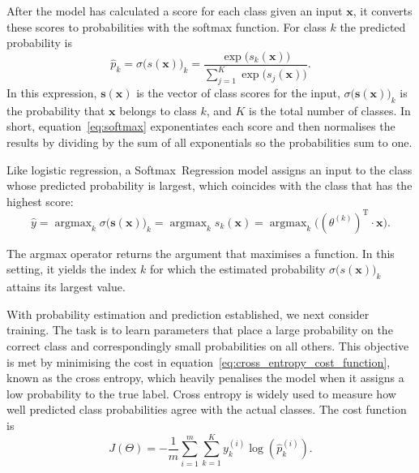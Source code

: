 \documentclass[12pt,letter]{article}
\begin{document}
After the model has calculated a score for each class given an input $\mathbf{x}$, it converts these scores to probabilities with the softmax function. For class $k$ the predicted probability is
\begin{equation}
\hat{p}_k = \sigma\big(s(\textbf{x}) \big)_k = \frac{\exp \big(s_k(\textbf{x})\big)}{\sum_{j=1}^{K} \exp \big(s_j(\textbf{x}) \big)}.
\label{eq:softmax}
\end{equation}
In this expression, $\mathbf{s}(\mathbf{x})$ is the vector of class scores for the input, $\sigma\bigl(\mathbf{s}(\mathbf{x})\bigr)_k$ is the probability that $\mathbf{x}$ belongs to class $k$, and $K$ is the total number of classes. In short, equation~\ref{eq:softmax} exponentiates each score and then normalises the results by dividing by the sum of all exponentials so the probabilities sum to one.


Like logistic regression, a Softmax~Regression model assigns an input to the class whose predicted probability is largest, which coincides with the class that has the highest score:
\begin{equation}
\hat{y} = \mathop{\text{argmax}}_{k} \sigma \big(\textbf{s}(\textbf{x})\big)_k = \mathop{\text{argmax}}_{k} s_k(\textbf{x}) = \mathop{\text{argmax}}_{k} \big( (\theta^{(k)})^\text{T} \cdot \textbf{x} \big).
\end{equation}


\begin{mdframed}[middlelinewidth=0.5mm]
\begin{center}
\end{center}
The argmax operator returns the argument that maximises a function. In this setting, it yields the index $k$ for which the estimated probability $\sigma \bigl(s(\mathbf{x})\bigr)_k$ attains its largest value.
\end{mdframed}



With probability estimation and prediction established, we next consider training. The task is to learn parameters that place a large probability on the correct class and correspondingly small probabilities on all others. This objective is met by minimising the cost in equation~\ref{eq:cross_entropy_cost_function}, known as the cross entropy, which heavily penalises the model when it assigns a low probability to the true label. Cross entropy is widely used to measure how well predicted class probabilities agree with the actual classes. The cost function is
\begin{equation}
J(\Theta) = -\frac{1}{m} \sum_{i=1}^{m} \sum_{k=1}^{K} y_k^{(i)} \log (\hat{p}_k^{(i)}).
\label{eq:cross_entropy_cost_function}
\end{equation}
\end{document}
